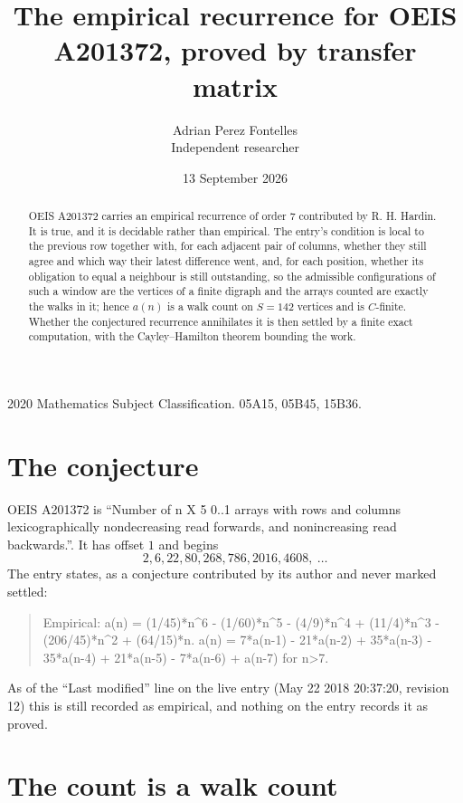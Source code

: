 \documentclass[11pt,a4paper]{article}
\title{The empirical recurrence for OEIS A201372, proved by transfer matrix}
\author{Adrian Perez Fontelles\\ \small Independent researcher}
\date{13 September 2026}
\theoremstyle{plain}
\theoremstyle{definition}
\begin{document}
\maketitle

\begin{abstract}
OEIS A201372 carries an empirical recurrence of order $7$ contributed by R. H. Hardin. It is
true, and it is decidable rather than empirical. The entry's condition is local to the previous row together with, for each adjacent pair of columns, whether they still agree and which way their latest difference went, and, for each position, whether its obligation to equal a neighbour is still outstanding, so
the admissible configurations of such a window are the vertices of a finite digraph and the
arrays counted are exactly the walks in it; hence $a(n)$ is a walk count on $S=142$ vertices
and is $C$-finite. Whether the conjectured recurrence annihilates it is then settled by a
finite exact computation, with the Cayley--Hamilton theorem bounding the work.
\end{abstract}

\noindent\small 2020 Mathematics Subject Classification. 05A15, 05B45, 15B36.\normalsize

\section{The conjecture}

OEIS A201372 is ``Number of n X 5 0..1 arrays with rows and columns lexicographically nondecreasing read forwards, and nonincreasing read backwards.''. It has offset $1$ and begins
\[
2, 6, 22, 80, 268, 786, 2016, 4608,\ \dots
\]
The entry states, as a conjecture contributed by its author and never marked settled:
\begin{quote}
Empirical: a(n) = (1/45)*n\^{}6 - (1/60)*n\^{}5 - (4/9)*n\^{}4 + (11/4)*n\^{}3 - (206/45)*n\^{}2 + (64/15)*n. a(n) = 7*a(n-1) - 21*a(n-2) + 35*a(n-3) - 35*a(n-4) + 21*a(n-5) - 7*a(n-6) + a(n-7) for n>7.
\end{quote}
As of the ``Last modified'' line on the live entry (May 22 2018 20:37:20, revision 12) this is still
recorded as empirical, and nothing on the entry records it as proved.

\section{The count is a walk count}
\end{document}
